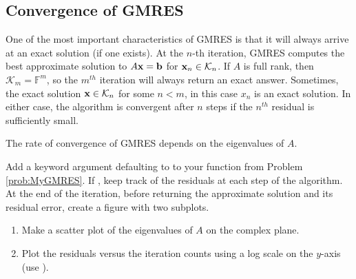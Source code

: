 \subsection*{Convergence of GMRES} %

One of the most important characteristics of GMRES is that it will always arrive at an exact solution (if one exists).
At the $n$-th iteration, GMRES computes the best approximate solution to $A\mathbf{x} = \mathbf{b}$ for $\mathbf{x}_n \in \mathcal{K}_n$.
If $A$ is full rank, then $\mathcal{K}_m = \mathbb{F}^m$, so the $m^{th}$ iteration will always return an exact answer.
Sometimes, the exact solution $\mathbf{x} \in \mathcal{K}_n$ for some $n<m$, in this case  $x_n$ is an exact solution.
In either case, the algorithm is convergent after $n$ steps if the $n^{th}$ residual is sufficiently small.

The rate of convergence of GMRES depends on the eigenvalues of $A$.

\begin{problem}
\label{prob:plot_gmres}
Add a keyword argument  defaulting to  to your function from Problem \ref{prob:MyGMRES}.
If , keep track of the residuals at each step of the algorithm.
At the end of the iteration, before returning the approximate solution and its residual error, create a figure with two subplots.
\begin{enumerate}
\item Make a scatter plot of the eigenvalues of $A$ on the complex plane.
\item Plot the residuals versus the iteration counts using a log scale on the $y$-axis\\(use ).
\end{enumerate}
\end{problem}

